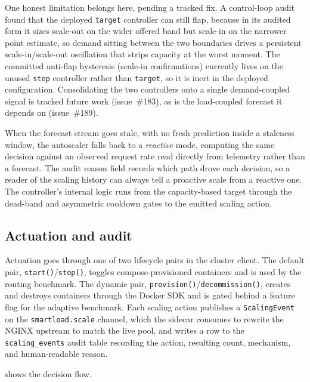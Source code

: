 One honest limitation belongs here, pending a tracked fix. A control-loop audit found
that the deployed \texttt{target} controller can still flap, because in its audited form
it sizes scale-out on the wider offered band but scale-in on the narrower point
estimate, so demand sitting between the two boundaries drives a persistent
scale-in/scale-out oscillation that strips capacity at the worst moment. The committed
anti-flap hysteresis (scale-in confirmations) currently lives on the unused
\texttt{step} controller rather than \texttt{target}, so it is inert in the deployed
configuration. Consolidating the two controllers onto a single demand-coupled signal is
tracked future work (issue~\#183), as is the load-coupled forecast it depends on
(issue~\#189).

When the forecast stream goes stale, with no fresh prediction inside a staleness
window, the autoscaler falls back to a \emph{reactive} mode, computing the same
decision against an observed request rate read directly from telemetry rather than
a forecast. The audit reason field records which path drove each decision, so a
reader of the scaling history can always tell a proactive scale from a reactive
one. The controller's internal logic runs from the capacity-based target through
the dead-band and asymmetric cooldown gates to the emitted scaling action.

\subsection{Actuation and audit}\label{imb:autoscaler_actuation}

Actuation goes through one of two lifecycle pairs in the cluster client. The
default pair, \texttt{start()}/\texttt{stop()}, toggles compose-provisioned
containers and is used by the routing benchmark. The dynamic pair,
\texttt{provision()}/\texttt{decommission()}, creates and destroys containers
through the Docker SDK and is gated behind a feature flag for the adaptive
benchmark. Each scaling action publishes a \texttt{ScalingEvent} on the
\texttt{smartload.scale} channel, which the sidecar consumes to rewrite the NGINX
upstream to match the live pool, and writes a row to the \texttt{scaling\_events}
audit table recording the action, resulting count, mechanism, and human-readable
reason.

 shows the decision flow.

